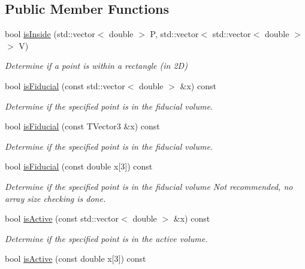 \subsection*{Public Member Functions}
\begin{DoxyCompactItemize}
\item 
bool \hyperlink{classlee_1_1GeometryHelper_a485c434af574df31cb1d60f960e00d4d}{is\-Inside} (std\-::vector$<$ double $>$ P, std\-::vector$<$ std\-::vector$<$ double $>$ $>$ V)
\begin{DoxyCompactList}\small\item\em Determine if a point is within a rectangle (in 2\-D) \end{DoxyCompactList}\item 
bool \hyperlink{classlee_1_1GeometryHelper_a88262b7435db78d1246caf1b5c6980b2}{is\-Fiducial} (const std\-::vector$<$ double $>$ \&x) const 
\begin{DoxyCompactList}\small\item\em Determine if the specified point is in the fiducial volume. \end{DoxyCompactList}\item 
bool \hyperlink{classlee_1_1GeometryHelper_a98ff5f70a9ebc2a5093481c4ea2a4285}{is\-Fiducial} (const T\-Vector3 \&x) const 
\begin{DoxyCompactList}\small\item\em Determine if the specified point is in the fiducial volume. \end{DoxyCompactList}\item 
bool \hyperlink{classlee_1_1GeometryHelper_ad13ea59dc2d7aed9a1cd6316654adc82}{is\-Fiducial} (const double x\mbox{[}3\mbox{]}) const 
\begin{DoxyCompactList}\small\item\em Determine if the specified point is in the fiducial volume Not recommended, no array size checking is done. \end{DoxyCompactList}\item 
bool \hyperlink{classlee_1_1GeometryHelper_ab79667933f066ad0fa408c71b46b405c}{is\-Active} (const std\-::vector$<$ double $>$ \&x) const 
\begin{DoxyCompactList}\small\item\em Determine if the specified point is in the active volume. \end{DoxyCompactList}\item 
bool \hyperlink{classlee_1_1GeometryHelper_a0131512c8c15c80d31f923a232ed59eb}{is\-Active} (const double x\mbox{[}3\mbox{]}) const 

\end{DoxyCompactItemize}
